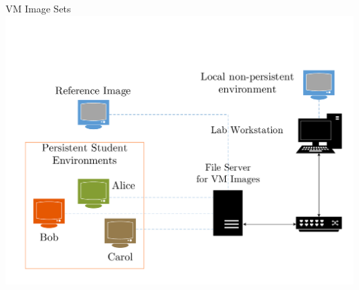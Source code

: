 \documentclass{beamer}
\begin{document}
	\begin{frame}{VM Image Sets}
		\includegraphics[page=1,width=\textwidth,clip=true, trim=0 0 0 1in]{vm-image-sets.pdf}
	\end{frame}
	
\end{document}
